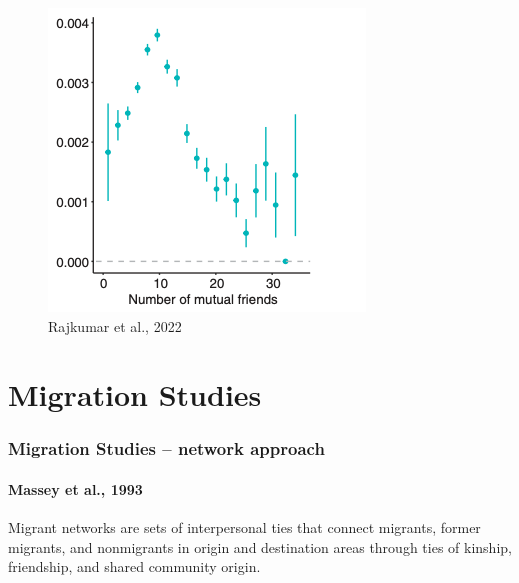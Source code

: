 \documentclass{beamer}
\begin{document}
\begin{frame}
{\begin{figure}
\begin{minipage}{.49\textwidth}
            \includegraphics[width = \textwidth]{number_friends.png}
         \end{minipage}
         \caption{Rajkumar et al., 2022}
      \end{figure}

   }
\end{frame}

\section[Migration Studies]{Migration Studies}
\begin{frame}
   \frametitle{Migration Studies -- network approach}
   \framesubtitle{Massey et al., 1993}
   \begin{block}{}
      Migrant networks are sets of interpersonal ties that connect migrants,
      former migrants, and nonmigrants in origin and destination areas through ties
      of kinship, friendship, and shared community origin.
   \end{block}
\end{frame}
\end{document}
